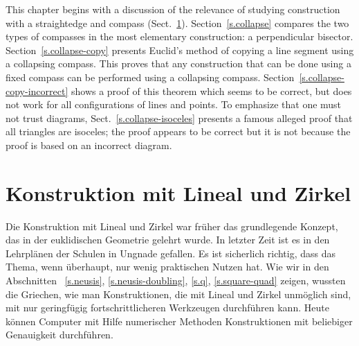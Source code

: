 \begin{figure}[hb]
{
}
\label{fig.fixed-compass}
\label{fig.collapsing-compass}
\end{figure}

This chapter begins with a discussion of the relevance of studying construction with a straightedge and compass (Sect.~\ref{s.relevance}).
Section~\ref{s.collapse} compares the two types of compasses in the most elementary construction: a perpendicular bisector. Section~\ref{s.collapse-copy} presents Euclid's method of copying a line segment using a collapsing compass. This proves that any construction that can be done using a fixed compass can be performed using a collapsing compass. Section~\ref{s.collapse-copy-incorrect} shows a proof of this theorem which seems to be correct, but does not work for all configurations of lines and points. To emphasize that one must not trust diagrams, Sect.~\ref{s.collapse-isoceles} presents a famous alleged proof that all triangles are isoceles; the proof appears to be correct but it is not because the proof is based on an incorrect diagram.

\section{Konstruktion mit Lineal und Zirkel}\label{s.relevance}

Die Konstruktion mit Lineal und Zirkel war früher das grundlegende Konzept, das in der euklidischen Geometrie gelehrt wurde. In letzter Zeit ist es in den Lehrplänen der Schulen in Ungnade gefallen. Es ist sicherlich richtig, dass das Thema, wenn überhaupt, nur wenig praktischen Nutzen hat. Wie wir in den Abschnitten ~\ref{s.neusis}, \ref{s.neusis-doubling}, \ref{s.q}, \ref{s.square-quad} zeigen, wussten die Griechen, wie man Konstruktionen, die mit Lineal und Zirkel unmöglich sind, mit nur geringfügig fortschrittlicheren Werkzeugen durchführen kann. Heute können Computer mit Hilfe numerischer Methoden Konstruktionen mit beliebiger Genauigkeit durchführen.

